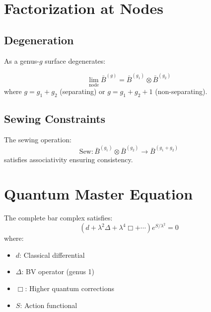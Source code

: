 \section{Factorization at Nodes}

\subsection{Degeneration}

As a genus-$g$ surface degenerates:

\begin{theorem}[Factorization]
$$\lim_{\text{node}} \bar{B}^{(g)} = \bar{B}^{(g_1)} \otimes \bar{B}^{(g_2)}$$
where $g = g_1 + g_2$ (separating) or $g = g_1 + g_2 + 1$ (non-separating).
\end{theorem}

\subsection{Sewing Constraints}

The sewing operation:
$$\text{Sew}: \bar{B}^{(g_1)} \otimes \bar{B}^{(g_2)} \to \bar{B}^{(g_1+g_2)}$$
satisfies associativity ensuring consistency.

\section{Quantum Master Equation}

\begin{theorem}
The complete bar complex satisfies:
$$(d + \lambda^2\Delta + \lambda^4\Box + \cdots)e^{S/\lambda^2} = 0$$
where:
\begin{itemize}
\item $d$: Classical differential
\item $\Delta$: BV operator (genus 1)
\item $\Box$: Higher quantum corrections
\item $S$: Action functional
\end{itemize}
\end{theorem}